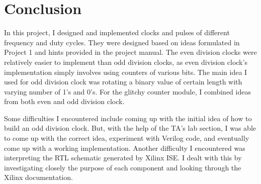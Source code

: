\documentclass{article}
\begin{document}
\section{Conclusion} 
In this project, I designed and implemented clocks and pulses of different frequency and duty cycles. They were designed based on ideas formulated in Project 1 and hints provided in the project manual. The even division clocks were relatively easier to implement than odd division clocks, as even division clock's implementation simply involves using counters of various bits. The main idea I used for odd division clock was rotating a binary value of certain length with varying number of 1's and 0's. For the glitchy counter module, I combined ideas from both even and odd division clock. \par
Some difficulties I encountered include coming up with the initial idea of how to build an odd division clock. But, with the help of the TA's lab section, I was able to come up with the correct idea, experiment with Verilog code, and eventually come up with a working implementation. Another difficulty I encountered was interpreting the RTL schematic generated by Xilinx ISE. I dealt with this by investigating closely the purpose of each component and looking through the Xilinx documentation.
\end{document}
